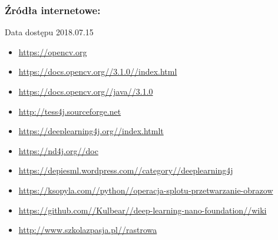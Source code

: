 \documentclass[a4paper,12pt]{article}
\begin{document}
	   
	   \subsubsection*{Źródła internetowe:}
	   Data dostępu 2018.07.15
	   \begin{itemize}
            \item \href{https://opencv.org}{\url{https://opencv.org}}
            \item \href{https://docs.opencv.org//3.1.0//index.html}{\url{https://docs.opencv.org//3.1.0//index.html}}
            \item \href{https://docs.opencv.org//java//3.1.0}{\url{https://docs.opencv.org//java//3.1.0}}
            
            \item \href{http://tess4j.sourceforge.net}{\url{http://tess4j.sourceforge.net}}
            
            \item \href{https://deeplearning4j.org//index.html}{\url{https://deeplearning4j.org//index.htmlt}}
            \item \href{https://nd4j.org//doc}{\url{https://nd4j.org//doc}}
            \item \href{https://depiesml.wordpress.com//category//deeplearning4j}{\url{https://depiesml.wordpress.com//category//deeplearning4j}}

            \item \href{https://ksopyla.com//python//operacja-splotu-przetwarzanie-obrazow}{\url{https://ksopyla.com//python//operacja-splotu-przetwarzanie-obrazow}}
            \item \href{https://github.com//Kulbear//deep-learning-nano-foundation//wiki//ReLU-and-Softmax-Activation-Functions}{\url{https://github.com//Kulbear//deep-learning-nano-foundation//wiki}}

            \item \href{http://www.szkolazpasja.pl//rastrowa}{\url{http://www.szkolazpasja.pl//rastrowa}}
	   \end{itemize}
	   
	   
	   
	   
	   

	        
	        
\end{document}
